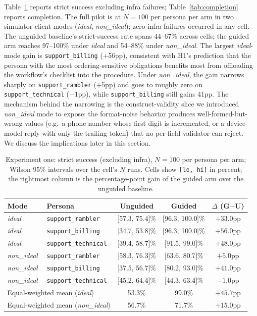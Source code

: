 \documentclass[11pt,a4paper]{article}
\newcommand{\rerunPlaceholderN}{100}
\begin{document}
Table~\ref{tab:strict} reports strict success excluding infra failures; Table~\ref{tab:completion} reports completion. The full pilot is at $N=\rerunPlaceholderN$ per persona per arm in two simulator client modes (\emph{ideal}, \emph{non\_ideal}); zero infra failures occurred in any cell. The unguided baseline's strict-success rate spans 44--67\% across cells; the guided arm reaches 97--100\% under \emph{ideal} and 54--88\% under \emph{non\_ideal}. The largest \emph{ideal}-mode gain is \texttt{support\_billing} (+56pp), consistent with H1's prediction that the persona with the most ordering-sensitive obligations benefits most from offloading the workflow's checklist into the procedure. Under \emph{non\_ideal}, the gain narrows sharply on \texttt{support\_rambler} (+5pp) and goes to roughly zero on \texttt{support\_technical} ($-1$pp), while \texttt{support\_billing} still gains 41pp. The mechanism behind the narrowing is the construct-validity slice we introduced \emph{non\_ideal} mode to expose: the format-noise behavior produces well-formed-but-wrong values (e.g.\ a phone number whose first digit is incremented, or a device-model reply with only the trailing token) that no per-field validator can reject. We discuss the implications later in this section.

\begin{table}[htbp]
  \centering
  \caption{Experiment one: strict success (excluding infra), $N=\rerunPlaceholderN$ per persona per arm; Wilson 95\% intervals over the cell's $N$ runs. Cells show \texttt{[lo, hi]} in percent; the rightmost column is the percentage-point gain of the guided arm over the unguided baseline.}
  \label{tab:strict}
  \begin{tabular}{llccc}
    \toprule
    Mode & Persona & Unguided & Guided & $\Delta$ (G$-$U) \\
    \midrule
    \emph{ideal}     & \texttt{support\_rambler}   & [57.3, 75.4]\% & [96.3, 100.0]\% & $+33.0$pp \\
    \emph{ideal}     & \texttt{support\_billing}   & [34.7, 53.8]\% & [96.3, 100.0]\% & $+56.0$pp \\
    \emph{ideal}     & \texttt{support\_technical} & [39.4, 58.7]\% & [91.5, 99.0]\%  & $+48.0$pp \\
    \midrule
    \emph{non\_ideal}& \texttt{support\_rambler}   & [58.3, 76.3]\% & [63.6, 80.7]\%  & $+5.0$pp  \\
    \emph{non\_ideal}& \texttt{support\_billing}   & [37.5, 56.7]\% & [80.2, 93.0]\%  & $+41.0$pp \\
    \emph{non\_ideal}& \texttt{support\_technical} & [45.2, 64.4]\% & [44.3, 63.4]\%  & $-1.0$pp  \\
    \midrule
    \multicolumn{2}{l}{Equal-weighted mean (\emph{ideal})}
                                                  & 53.3\% & 99.0\% & $+45.7$pp \\
    \multicolumn{2}{l}{Equal-weighted mean (\emph{non\_ideal})}
                                                  & 56.7\% & 71.7\% & $+15.0$pp \\
    \bottomrule
  \end{tabular}
\end{table}
\end{document}
